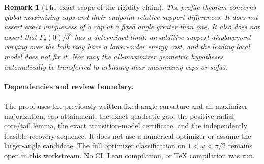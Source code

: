 \documentclass[11pt]{article}
\newtheorem{remark}[theorem]{Remark}
\begin{document}
\begin{remark}[The exact scope of the rigidity claim]
The profile theorem concerns global maximizing caps and their endpoint-relative support differences. It does not assert exact uniqueness of a cap at a fixed angle greater than one. It also does not assert that $F_\delta(0)/\delta^3$ has a determined limit: an additive support displacement varying over the bulk may have a lower-order energy cost, and the leading local model does not fix it. Nor may the all-maximizer geometric hypotheses automatically be transferred to arbitrary near-maximizing caps or sofas.
\end{remark}

\paragraph{Dependencies and review boundary.}
The proof uses the previously written fixed-angle curvature and all-maximizer majorization, cap attainment, the exact quadratic gap, the positive radial-core/tail lemma, the exact transition-model certificate, and the independently feasible recovery sequence. It does not use a numerical optimizer or assume the larger-angle candidate. The full optimizer classification on $1<\omega<\pi/2$ remains open in this workstream. No CI, Lean compilation, or TeX compilation was run.
\end{document}
